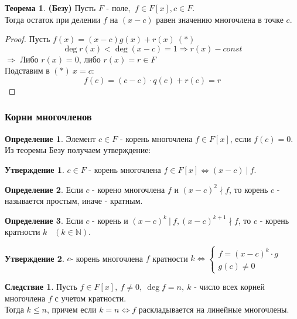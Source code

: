 \documentclass[a4paper, 12pt]{article}
\newcommand{\N}{\mathbb N}
\theoremstyle{definition}
\newtheorem*{definition}{Определение}
\newtheorem*{theorem}{Теорема}
\newtheorem*{consequense}{Следствие}
\newtheorem*{subtheorem}{Утверждение}
\begin{document}
  \begin{theorem}\textbf{(Безу)} 
    Пусть $F$ - поле, $ \ f \in F[x], c \in F$.\\
    Тогда остаток при делении $f$ на $(x-c)$ равен значению многочлена в точке $c$.     
  \end{theorem}
  \begin{proof}
    Пусть $f(x) = (x-c)g(x) + r(x)\  (*)$
    $$\deg r(x) < \deg (x-c) = 1 \Longrightarrow  r(x) - const$$
    $\Longrightarrow $ Либо $r(x) = 0$, либо $r(x)=r \in F$\\
    Подставим в $(*) \ x = c$:
    $$f(c) = (c-c)\cdot q(c) + r(c) = r$$
  \end{proof}   
  \subsubsection{Корни многочленов}
  \begin{definition}
    Элемент $c\in F$ - корень многочлена $f \in F[x]$, если $f(c) = 0$. Из теоремы Безу получаем утверждение: 
  \end{definition}
  \begin{subtheorem}
    $c \in F$ - корень многочлена $f\in F[x] \Longleftrightarrow (x-c) \ | \ f$.  
  \end{subtheorem}  
  \begin{definition}
    Если $c$ - корено многочлена $f$ и $(x-c)^2 \nmid f$, то корень $c$ - называется простым, иначе - кратным.
  \end{definition} 
  \begin{definition}
    Если $c$ - корень и $(x-c)^k \ | \ f, (x-c)^{k+1} \nmid f$, то $c$ - корень кратности $k$ \ $(k \in \N)$.     
  \end{definition} 
  \begin{subtheorem}
    $c$- корень многочлена $f$ кратности $k \Longleftrightarrow \begin{cases}
      f = (x-c)^k \cdot g\\
      g(c) \neq 0
    \end{cases}$  
  \end{subtheorem} 
  \begin{consequense}
    Пусть $f \in F[x], \ f \neq 0, \ \deg f = n, \ k$ - число всех корней многочлена $f$ с учетом кратности. \\
    Тогда $k\leq n$, причем если $k=n \Longleftrightarrow f$ раскладывается на линейные многочлены.    
  \end{consequense}
\end{document}
